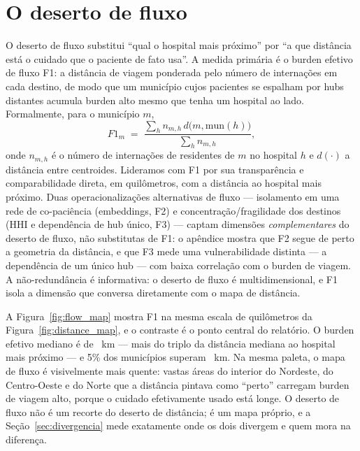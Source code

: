 
\section{O deserto de fluxo}
\label{sec:fluxo}

O deserto de fluxo substitui ``qual o hospital mais próximo'' por ``a que
distância está o cuidado que o paciente de fato usa''. A medida primária é o
burden efetivo de fluxo F1: a distância de viagem ponderada pelo número de
internações em cada destino, de modo que um município cujos pacientes se espalham
por hubs distantes acumula burden alto mesmo que tenha um hospital ao lado.
Formalmente, para o município $m$,
\[
F1_m \;=\; \frac{\sum_h n_{m,h}\, d\big(m, \text{mun}(h)\big)}{\sum_h n_{m,h}},
\]
onde $n_{m,h}$ é o número de internações de residentes de $m$ no hospital $h$ e
$d(\cdot)$ a distância entre centroides. Lideramos com F1 por sua transparência
e comparabilidade direta, em quilômetros, com a distância ao hospital mais
próximo. Duas operacionalizações alternativas de fluxo --- isolamento em uma
rede de co-paciência (embeddings, F2) e concentração/fragilidade dos destinos
(HHI e dependência de hub único, F3) --- captam dimensões \emph{complementares}
do deserto de fluxo, não substitutas de F1: o apêndice mostra que F2 segue de
perto a geometria da distância, e que F3 mede uma vulnerabilidade distinta ---
a dependência de um único hub --- com baixa correlação com o burden de viagem.
A não-redundância é informativa: o deserto de fluxo é multidimensional, e F1
isola a dimensão que conversa diretamente com o mapa de distância.

A Figura~\ref{fig:flow_map} mostra F1 na mesma escala de quilômetros da
Figura~\ref{fig:distance_map}, e o contraste é o ponto central do relatório. O
burden efetivo mediano é de \valMedFround~km --- mais do triplo da distância
mediana ao hospital mais próximo --- e 5\% dos municípios superam
\valMedFninetyfive~km.%
Na mesma paleta, o mapa de fluxo é visivelmente mais quente: vastas áreas do
interior do Nordeste, do Centro-Oeste e do Norte que a distância pintava como
``perto'' carregam burden de viagem alto, porque o cuidado efetivamente usado
está longe. O deserto de fluxo não é um recorte do deserto de distância; é um
mapa próprio, e a Seção~\ref{sec:divergencia} mede exatamente onde os dois
divergem e quem mora na diferença.
